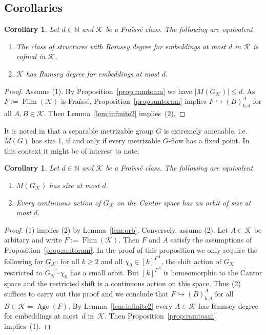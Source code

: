 \documentclass[12pt]{amsart}
\theoremstyle{plain}
\newtheorem{corollary}[theorem]{Corollary}
\theoremstyle{definition}
\begin{document}
\subsection{Corollaries}\label{sec:cor}

\begin{corollary}\label{cor:asymptotic} Let $d\in{\mathbb N}$ and  ${\mathcal K}$ be a Fra\"iss\'e class.
The following are equivalent.
\begin{enumerate}\itemsep=0pt
 \item The class of structures with Ramsey degree for embeddings at most $d$ in ${\mathcal K}$ is cofinal in ${\mathcal K}$.
\item ${\mathcal K}$ has Ramsey degree for embeddings at most $d$.
\end{enumerate}
\end{corollary}

\begin{proof}
Assume (1). By Proposition~\ref{prop:ramtoam} we have $|M(G_{\mathcal K})|\le d$. 
As $F:=\operatorname{Flim}({\mathcal K})$ is Fra\"iss\'e, Proposition~\ref{prop:amtoram} implies $F\hookrightarrow (B)^A_{k,d}$ for all
$A,B\in{\mathcal K}$. Then Lemma~\ref{lem:infinite2} implies~(2).
\end{proof}

It is noted in \cite[$\S 1$(D)]{kpt} that a separable metrizable group $G$ is extremely amenable, i.e.
$M(G)$ has size 1, if and only if every metrizable $G$-flow has a fixed point. In this context it might be of interest to note:

\begin{corollary}  Let $d\in{\mathbb N}$ and ${\mathcal K}$ be a Fra\"iss\'e class.
The following are equivalent.
\begin{enumerate}\itemsep=0pt
\item $M(G_{\mathcal K})$ has size at most $d$.
\item Every continuous action of $G_{\mathcal K}$ on the Cantor space has an orbit of size at most $d$.
\end{enumerate}
\end{corollary}

\begin{proof}
(1) implies (2)  by Lemma~\ref{lem:orb}. Conversely, assume (2).
Let $A\in{\mathcal K}$ be arbitary and write $F:=\operatorname{Flim}({\mathcal K})$. Then $F$ and $A$ satisfy the assumptions of
Proposition~\ref{prop:amtoram}. In the proof of this proposition 
we only require the following for $G_{\mathcal K}$: for all $k\ge 2$
and all $\chi_0\in[k]^{F^A}$, the shift action of $G_{\mathcal K}$ restricted to $\overline{G_{\mathcal K}\cdot\chi_0}$ has a small orbit.
But $[k]^{F^A}$ is homeomorphic to the Cantor space and the restricted shift is a continuous action on this space.
Thus (2) suffices to carry out this proof and we conclude that $F\hookrightarrow(B)^A_{k,d}$ for all $B\in{\mathcal K}=\operatorname{Age}(F)$. 
By Lemma~\ref{lem:infinite2} 
every $A\in{\mathcal K}$ has Ramsey degree for embeddings at most~$d$ in~${\mathcal K}$. Then 
Proposition~\ref{prop:ramtoam} implies~(1).
\end{proof}
\end{document}
